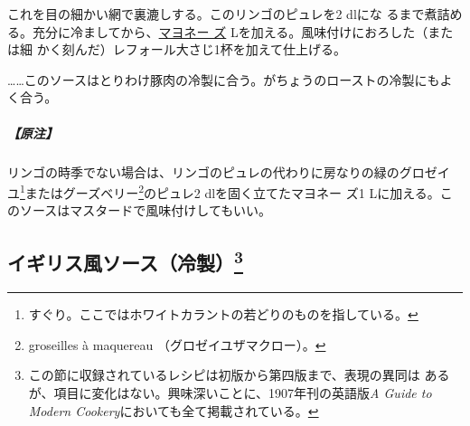 \begin{recette}
これを目の細かい網で裏漉しする。このリンゴのピュレを2\undemi{} dlにな
るまで煮詰める。充分に冷ましてから、\protect\hyperlink{mayonnaise}{マヨネー
ズ}\troisquarts{} Lを加える。風味付けにおろした（または細
かく刻んだ）レフォール大さじ1\undemi{}杯を加えて仕上げる。

\ldots{}\ldots{}このソースはとりわけ豚肉の冷製に合う。がちょうのローストの冷製にもよく合う。

\hypertarget{nota-sauce-suedoise}{%
\subparagraph{【原注】}\label{nota-sauce-suedoise}}

リンゴの時季でない場合は、リンゴのピュレの代わりに房なりの緑のグロゼイ
ユ\footnote{すぐり。ここではホワイトカラントの若どりのものを指している。}またはグーズベリー\footnote{groseilles
  à maquereau （グロゼイユザマクロー）。}のピュレ2\undemi{}
dlを固く立てたマヨネー ズ1
Lに加える。このソースはマスタードで風味付けしてもいい。
\end{recette}
\hypertarget{sauces-froides-anglaises}{%
\subsection[イギリス風ソース（冷製）]{\texorpdfstring{イギリス風ソース（冷製）\footnote{この節に収録されているレシピは初版から第四版まで、表現の異同は
  あるが、項目に変化はない。興味深いことに、1907年刊の英語版\emph{A
  Guide to Modern Cookery}においても全て掲載されている。}}{イギリス風ソース（冷製）}}\label{sauces-froides-anglaises}}


